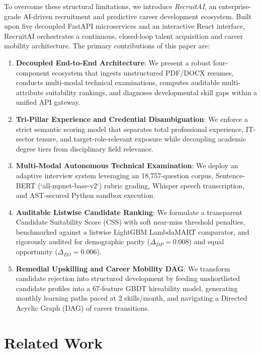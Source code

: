 \documentclass[conference]{IEEEtran}
\begin{document}
To overcome these structural limitations, we introduce \textit{RecruitAI}, an enterprise-grade AI-driven recruitment and predictive career development ecosystem. Built upon five decoupled FastAPI microservices and an interactive React interface, RecruitAI orchestrates a continuous, closed-loop talent acquisition and career mobility architecture. The primary contributions of this paper are:
\begin{enumerate}
    \item \textbf{Decoupled End-to-End Architecture}: We present a robust four-component ecosystem that ingests unstructured PDF/DOCX resumes, conducts multi-modal technical examinations, computes auditable multi-attribute suitability rankings, and diagnoses developmental skill gaps within a unified API gateway.
    \item \textbf{Tri-Pillar Experience and Credential Disambiguation}: We enforce a strict semantic scoring model that separates total professional experience, IT-sector tenure, and target-role-relevant exposure while decoupling academic degree tiers from disciplinary field relevance.
    \item \textbf{Multi-Modal Autonomous Technical Examination}: We deploy an adaptive interview system leveraging an 18,757-question corpus, Sentence-BERT (`all-mpnet-base-v2`) rubric grading, Whisper speech transcription, and AST-secured Python sandbox execution.
    \item \textbf{Auditable Listwise Candidate Ranking}: We formulate a transparent Candidate Suitability Score (CSS) with soft near-miss threshold penalties, benchmarked against a listwise LightGBM LambdaMART comparator, and rigorously audited for demographic parity ($\Delta_{DP}=0.008$) and equal opportunity ($\Delta_{EO}=0.006$).
    \item \textbf{Remedial Upskilling and Career Mobility DAG}: We transform candidate rejection into structured development by feeding unshortlisted candidate profiles into a 67-feature GBDT hireability model, generating monthly learning paths paced at 2 skills/month, and navigating a Directed Acyclic Graph (DAG) of career transitions.
\end{enumerate}

\section{Related Work}
\end{document}
